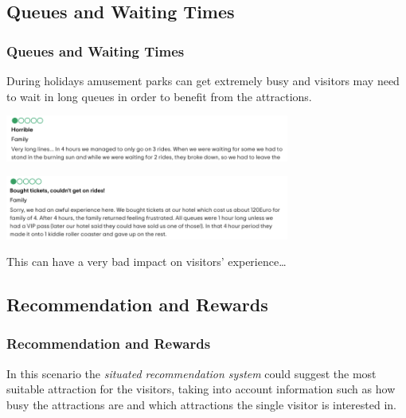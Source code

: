 \subsection{Queues and Waiting Times}\label{subsec:queues-and-waiting-times}
\begin{frame}
    \frametitle{Queues and Waiting Times}
    During holidays amusement parks can get extremely busy and visitors may need to wait in long queues in order to benefit from the attractions.

    \bigskip

    \begin{center}
        \includegraphics[width=0.7\textwidth]{../img/review1}
        \label{fig:review1}
    \end{center}

    \smallskip

    \begin{center}
        \includegraphics[width=0.7\textwidth]{../img/review2}
        \label{fig:review2}
    \end{center}

    \bigskip

    This can have a very bad impact on visitors' experience\ldots

\end{frame}

\subsection{Recommendation and Rewards}\label{subsec:recommendation-and-rewards2}
\begin{frame}
    \frametitle{Recommendation and Rewards}
    In this scenario the \textit{situated recommendation system} could suggest the most suitable attraction for the visitors, taking into account information such as how busy the attractions are and which attractions the single visitor is interested in.
\end{frame}

